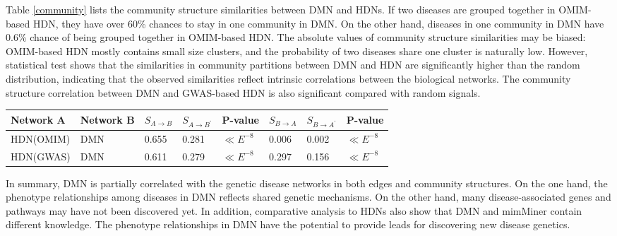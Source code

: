 Table \ref{community} lists the community structure similarities between DMN and HDNs.
If two diseases are grouped together in OMIM-based HDN,
they have over 60\% chances to stay in one community in DMN.
On the other hand, diseases in one community in DMN have 0.6\% chance of being grouped together in OMIM-based HDN. The absolute values of community structure similarities may be biased:
OMIM-based HDN mostly contains small size clusters, and the probability of two diseases share one cluster
is naturally low.
However, statistical test shows that the similarities in community partitions between DMN and HDN are significantly higher than the random distribution,
indicating that the observed similarities reflect intrinsic correlations between the biological networks.
The community structure correlation between DMN and GWAS-based HDN is also significant compared with random signals.
\begin{table*}[h!]
\caption{Compare the community structures between DMN and the genetic disease networks. $S_{A\to B}$ and $S_{B\to A}$ represent the two-way the similarity in community partitions between network $A$ and $B$.\label{community}}
\begin{tabular}{llllllll}
\\\hline
Network A & Network B & $S_{A\to B}$ & $S_{A \to B^{'}}$ & P-value   &$S_{B \to A}$  &$S_{B \to A^{'}}$ &P-value\\\hline
HDN(OMIM)       &DMN        &0.655         &0.281	                   &$\ll E^{-8}$	 &0.006	      &0.002	          &$\ll E^{-8}$\\\hline
HDN(GWAS)      & DMN       &0.611	     &0.279	                   &$\ll E^{-8}$	 &0.297	      &0.156	          &$\ll E^{-8}$\\\hline
\end{tabular}
\end{table*}





In summary, DMN is partially correlated with the genetic disease networks in both edges and community structures. On the one hand, the phenotype relationships among diseases in DMN reflects shared genetic mechanisms. On the other hand, many disease-associated genes and pathways may have not been discovered yet. In addition, comparative analysis to HDNs also show that DMN and mimMiner contain different knowledge. The phenotype relationships in DMN have the potential to provide leads for discovering new disease genetics.

